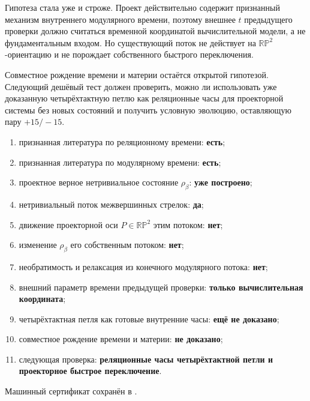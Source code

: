 Гипотеза стала уже и строже. Проект действительно содержит признанный
механизм внутреннего модулярного времени, поэтому внешнее $t$ предыдущего
проверки должно считаться временной координатой вычислительной модели, а не
фундаментальным входом. Но существующий поток не действует на
$\mathbb{RP}^2$-ориентацию и не порождает собственного быстрого переключения.

Совместное рождение времени и материи остаётся открытой гипотезой. Следующий
дешёвый тест должен проверить, можно ли использовать уже доказанную
четырёхтактную петлю как реляционные часы для проекторной системы без новых
состояний и получить условную эволюцию, оставляющую пару $+15/-15$.

\begin{protocol}
\begin{enumerate}
 \item признанная литература по реляционному времени: \textbf{есть};
 \item признанная литература по модулярному времени: \textbf{есть};
 \item проектное верное нетривиальное состояние $\rho_\beta$:
 \textbf{уже построено};
 \item нетривиальный поток межвершинных стрелок: \textbf{да};
 \item движение проекторной оси $P\in\mathbb{RP}^2$ этим потоком:
 \textbf{нет};
 \item изменение $\rho_\beta$ его собственным потоком: \textbf{нет};
 \item необратимость и релаксация из конечного модулярного потока:
 \textbf{нет};
 \item внешний параметр времени предыдущей проверки:
 \textbf{только вычислительная координата};
 \item четырёхтактная петля как готовые внутренние часы:
 \textbf{ещё не доказано};
 \item совместное рождение времени и материи: \textbf{не доказано};
 \item следующая проверка:
 \textbf{реляционные часы четырёхтактной петли и проекторное быстрое переключение}.
\end{enumerate}
\end{protocol}

Машинный сертификат сохранён в
.